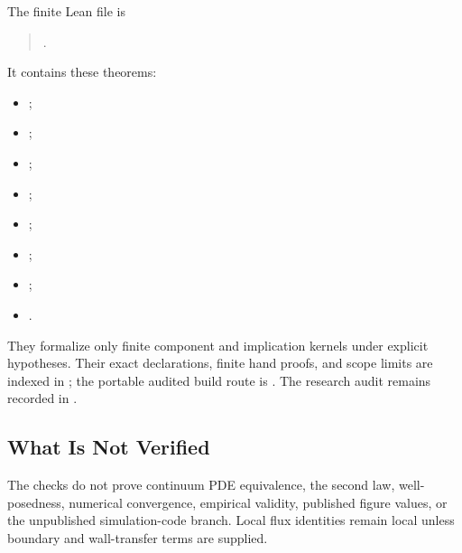 The finite Lean file is
\begin{quote}
\footnotesize\raggedright
{}.
\end{quote}
It contains these theorems:
\begin{itemize}[leftmargin=2em]
\item {};
\item {};
\item {};
\item {};
\item {};
\item {};
\item {};
\item {}.
\end{itemize}
They formalize only finite component and implication kernels under explicit
hypotheses.
Their exact declarations, finite hand proofs, and scope limits are indexed in
; the portable audited build route is
.  The research audit remains recorded
in .

\subsection*{What Is Not Verified}

The checks do not prove continuum PDE equivalence, the second law,
well-posedness, numerical convergence, empirical validity, published figure
values, or the unpublished simulation-code branch.  Local flux identities remain
local unless boundary and wall-transfer terms are supplied.
